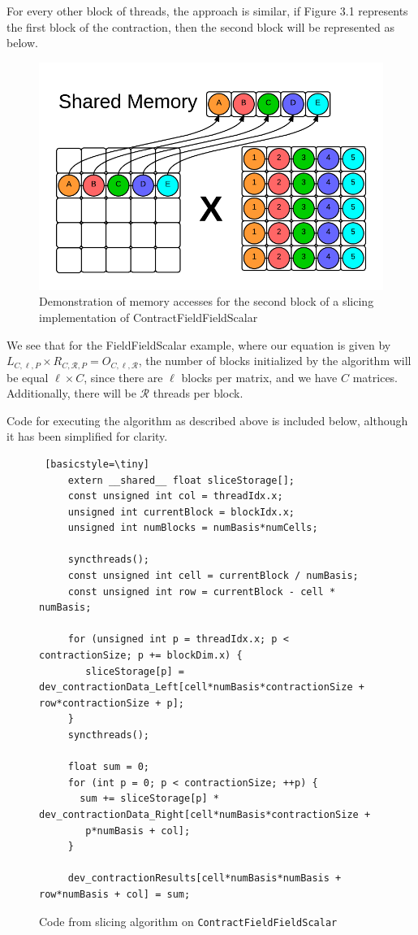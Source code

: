 	For every other block of threads, the approach is similar, if Figure 3.1 represents the first block of the contraction, then the second block will be represented as below. 

\begin{figure}[b]
    \centering
    \includegraphics[scale = .55]{ContractFieldFieldScalarGraphic2}
    \caption{Demonstration of memory accesses for the second block of a slicing implementation of ContractFieldFieldScalar}
\end{figure}

We see that for the FieldFieldScalar example, where our equation is given by $L_{C,\ell,P} \times R_{C, \mathcal{R}, P} = O_{C,\ell, \mathcal{R}}$, the number of blocks initialized by the algorithm will be equal $\ell \times C$, since there are $\ell$ blocks per matrix, and we have $C$ matrices. Additionally, there will be $\mathcal{R}$ threads per block. 

	Code for executing the algorithm as described above is included below, although it has been simplified for clarity. 

\begin{figure}[ht]
    \begin{lstlisting} [basicstyle=\tiny]
     extern __shared__ float sliceStorage[];
     const unsigned int col = threadIdx.x;
     unsigned int currentBlock = blockIdx.x;
     unsigned int numBlocks = numBasis*numCells;
     
     syncthreads();
     const unsigned int cell = currentBlock / numBasis;
     const unsigned int row = currentBlock - cell * numBasis;

     for (unsigned int p = threadIdx.x; p < contractionSize; p += blockDim.x) {
        sliceStorage[p] = dev_contractionData_Left[cell*numBasis*contractionSize + row*contractionSize + p];
     }
     syncthreads();

     float sum = 0;
     for (int p = 0; p < contractionSize; ++p) {
       sum += sliceStorage[p] * dev_contractionData_Right[cell*numBasis*contractionSize +
        p*numBasis + col];
     }

     dev_contractionResults[cell*numBasis*numBasis + row*numBasis + col] = sum;
 \end{lstlisting}
\caption{Code from slicing algorithm on \texttt{ContractFieldFieldScalar}
\label{lst:ContractFieldFieldScalarSlice}} 
\end{figure}


